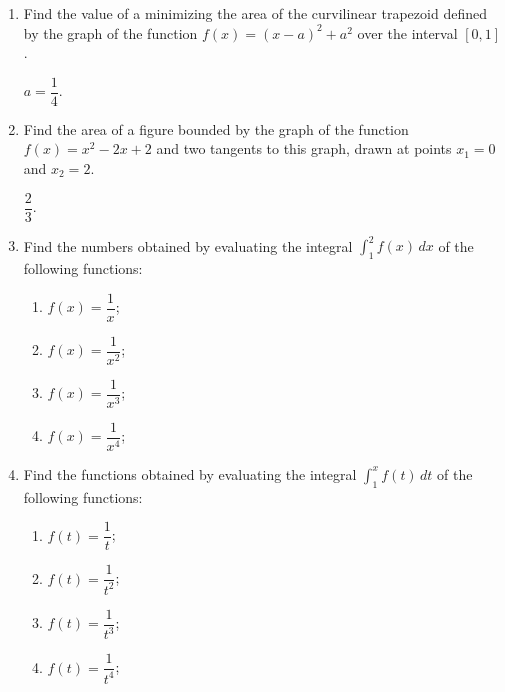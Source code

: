 \begin{enumerate}[label=\textcolor{IndianRed}{Problem \arabic*},leftmargin=2cm]
\item Find the value of a minimizing the area of the curvilinear trapezoid defined by the graph of the function $f (x) = (x - a)^{2} +a^{2}$ over the interval $[0, 1]$.

\Answer $a = \dfrac{1}{4}$.

\item Find the area of a figure bounded by the graph of the function $f (x) = x^{2} - 2x +2$ and two tangents to this graph, drawn at points $x_{1} = 0$ and $x_{2} = 2$.

\Answer $ \dfrac{2}{3}$.

\item Find the numbers obtained by evaluating the integral 
$\displaystyle\int_{1}^{2} f(x) \, dx$ of the following functions: 

\begin{enumerate}[label=(\alph*)]
 \item $f(x) = \dfrac{1}{x}$;
 \item $f(x) = \dfrac{1}{x^{2}}$;
 \item $f(x) = \dfrac{1}{x^{3}}$;
 \item $f(x) = \dfrac{1}{x^{4}}$;
 \end{enumerate}

\Answer {}

\item Find the functions obtained by evaluating the integral $\displaystyle\int_{1}^{x} f(t) \, dt$ of the following functions: 
\begin{enumerate}[label=(\alph*)]
 \item $f(t) = \dfrac{1}{t}$;
 \item $f(t) = \dfrac{1}{t^{2}}$;
 \item $f(t) = \dfrac{1}{t^{3}}$;
 \item $f(t) = \dfrac{1}{t^{4}}$;
 \end{enumerate}
 
\Answer {}
 

\end{enumerate}
